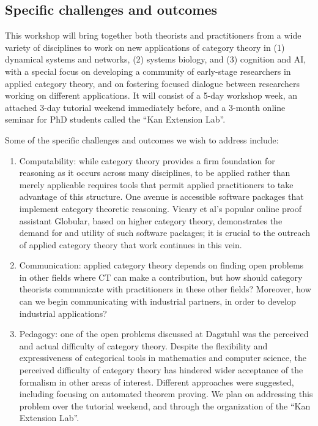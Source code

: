 \documentclass{article}
\begin{document}

\subsection{Specific challenges and outcomes}
This workshop will bring together both theorists and practitioners from a wide variety of disciplines to work on new applications of category theory in (1) dynamical systems and networks, (2) systems biology, and (3) cognition and AI, with a special focus on developing a community of early-stage researchers in applied category theory, and on fostering focused dialogue between researchers working on different applications. It will consist of a 5-day workshop week, an attached 3-day tutorial weekend immediately before, and a 3-month online seminar for PhD students called the ``Kan Extension Lab''.

Some of the specific challenges and outcomes we wish to address include:
\begin{enumerate}
  \item Computability: while category theory provides a firm foundation for reasoning as it occurs across many disciplines, to be applied rather than merely applicable requires tools that permit applied practitioners to take advantage of this structure. One avenue is accessible software packages that implement category theoretic reasoning.  Vicary et al's popular online proof assistant Globular, based on higher category theory, demonstrates the demand for and utility of such software packages; it is crucial to the outreach of applied category theory that work continues in this vein.
\item Communication: applied category theory depends on finding open problems in other fields where CT can make a contribution, but how should category theorists communicate with practitioners in these other fields? Moreover, how can we begin communicating with industrial partners, in order to develop industrial applications? %
\item Pedagogy: one of the open problems discussed at Dagstuhl was the perceived and actual difficulty of category theory. Despite the flexibility and expressiveness of categorical tools in mathematics and computer science, the perceived difficulty of category theory has hindered wider acceptance of the formalism in other areas of interest. Different approaches were suggested, including focusing on automated theorem proving. We plan on addressing this problem over the tutorial weekend, and through the organization of the ``Kan Extension Lab''.
\end{enumerate}
\end{document}
